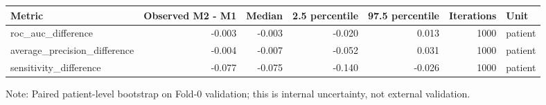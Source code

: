 \begin{table}[t]
\centering
\small
\begin{tabular}{lrrrrrl}
\toprule
Metric & Observed M2 - M1 & Median & 2.5 percentile & 97.5 percentile & Iterations & Unit \\
\midrule
roc\_auc\_difference & -0.003 & -0.003 & -0.020 & 0.013 & 1000 & patient \\
average\_precision\_difference & -0.004 & -0.007 & -0.052 & 0.031 & 1000 & patient \\
sensitivity\_difference & -0.077 & -0.075 & -0.140 & -0.026 & 1000 & patient \\
\bottomrule
\end{tabular}
\vspace{2pt}
\parbox{0.98\textwidth}{\footnotesize Note: Paired patient-level bootstrap on Fold-0 validation; this is internal uncertainty, not external validation.}
\end{table}

